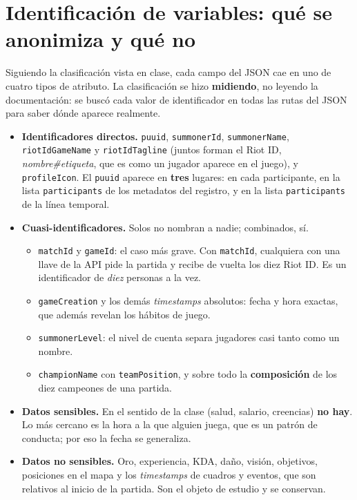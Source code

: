 \documentclass[11pt,letterpaper]{article}
\begin{document}
\section{Identificación de variables: qué se anonimiza y qué no}

Siguiendo la clasificación vista en clase, cada campo del JSON cae en uno de cuatro
tipos de atributo. La clasificación se hizo \textbf{midiendo}, no leyendo la
documentación: se buscó cada valor de identificador en todas las rutas del JSON para
saber dónde aparece realmente.

\sloppy
\begin{itemize}[leftmargin=1.4em,itemsep=.35em]
  \item \textbf{Identificadores directos.} \texttt{puuid}, \texttt{summonerId},
        \texttt{summonerName}, \texttt{riotIdGameName} y \texttt{riotIdTagline}
        (juntos forman el Riot ID, \emph{nombre\#etiqueta}, que es como un jugador
        aparece en el juego), y \texttt{profileIcon}. El \texttt{puuid} aparece en
        \textbf{tres} lugares: en cada participante, en la lista
        \texttt{participants} de los metadatos del registro, y en la lista
        \texttt{participants} de la línea temporal.
  \item \textbf{Cuasi-identificadores.} Solos no nombran a nadie; combinados, sí.
        \begin{itemize}[itemsep=.15em]
          \item \texttt{matchId} y \texttt{gameId}: el caso más grave. Con
                \texttt{matchId}, cualquiera con una llave de la API pide la
                partida y recibe de vuelta los diez Riot ID. Es un identificador
                de \emph{diez} personas a la vez.
          \item \texttt{gameCreation} y los demás \emph{timestamps} absolutos:
                fecha y hora exactas, que además revelan los hábitos de juego.
          \item \texttt{summonerLevel}: el nivel de cuenta separa jugadores casi
                tanto como un nombre.
          \item \texttt{championName} con \texttt{teamPosition}, y sobre todo la
                \textbf{composición} de los diez campeones de una partida.
        \end{itemize}
  \item \textbf{Datos sensibles.} En el sentido de la clase (salud, salario,
        creencias) \textbf{no hay}. Lo más cercano es la hora a la que alguien
        juega, que es un patrón de conducta; por eso la fecha se generaliza.
  \item \textbf{Datos no sensibles.} Oro, experiencia, KDA, daño, visión, objetivos,
        posiciones en el mapa y los \emph{timestamps} de cuadros y eventos, que son
        relativos al inicio de la partida. Son el objeto de estudio y se conservan.
\end{itemize}
\fussy
\end{document}
